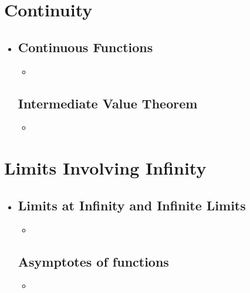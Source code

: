 \section{Continuity}
\begin{itemize}
  \item []

  \subsection{Continuous Functions}
  \begin{itemize}
    \item
  \end{itemize}

  \subsection{Intermediate Value Theorem}
  \begin{itemize}
    \item
  \end{itemize}

\end{itemize}

\section{Limits Involving Infinity}
\begin{itemize}
  \item []

  \subsection{Limits at Infinity and Infinite Limits}
  \begin{itemize}
    \item
  \end{itemize}

  \subsection{Asymptotes of functions}
  \begin{itemize}
    \item
  \end{itemize}

\end{itemize}

